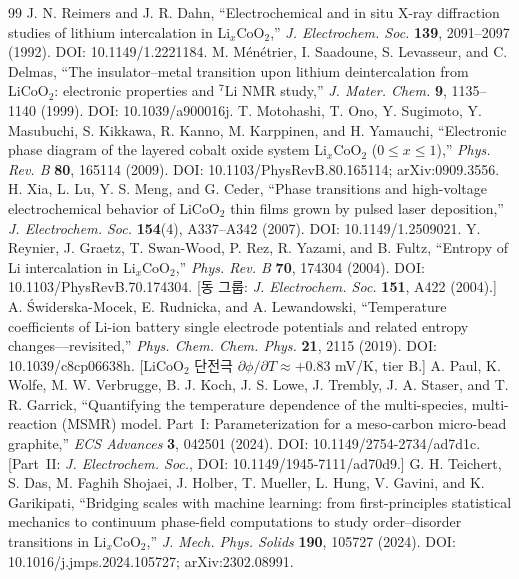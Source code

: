\documentclass[11pt,a4paper]{article}
\begin{document}
\begin{thebibliography}{99}
 J. N. Reimers and J. R. Dahn, ``Electrochemical and in situ X-ray diffraction studies of lithium intercalation in Li$_x$CoO$_2$,'' \emph{J. Electrochem. Soc.} \textbf{139}, 2091--2097 (1992). DOI: 10.1149/1.2221184.
 M. M\'en\'etrier, I. Saadoune, S. Levasseur, and C. Delmas, ``The insulator--metal transition upon lithium deintercalation from LiCoO$_2$: electronic properties and $^7$Li NMR study,'' \emph{J. Mater. Chem.} \textbf{9}, 1135--1140 (1999). DOI: 10.1039/a900016j.
 T. Motohashi, T. Ono, Y. Sugimoto, Y. Masubuchi, S. Kikkawa, R. Kanno, M. Karppinen, and H. Yamauchi, ``Electronic phase diagram of the layered cobalt oxide system Li$_x$CoO$_2$ ($0\le x\le1$),'' \emph{Phys. Rev. B} \textbf{80}, 165114 (2009). DOI: 10.1103/PhysRevB.80.165114; arXiv:0909.3556.
 H. Xia, L. Lu, Y. S. Meng, and G. Ceder, ``Phase transitions and high-voltage electrochemical behavior of LiCoO$_2$ thin films grown by pulsed laser deposition,'' \emph{J. Electrochem. Soc.} \textbf{154}(4), A337--A342 (2007). DOI: 10.1149/1.2509021.
 Y. Reynier, J. Graetz, T. Swan-Wood, P. Rez, R. Yazami, and B. Fultz, ``Entropy of Li intercalation in Li$_x$CoO$_2$,'' \emph{Phys. Rev. B} \textbf{70}, 174304 (2004). DOI: 10.1103/PhysRevB.70.174304. [동 그룹: \emph{J. Electrochem. Soc.} \textbf{151}, A422 (2004).]
 A. {\'S}widerska-Mocek, E. Rudnicka, and A. Lewandowski, ``Temperature coefficients of Li-ion battery single electrode potentials and related entropy changes---revisited,'' \emph{Phys. Chem. Chem. Phys.} \textbf{21}, 2115 (2019). DOI: 10.1039/c8cp06638h. [LiCoO$_2$ 단전극 $\partial\phi/\partial T\approx+0.83$ mV/K, tier B.]
 A. Paul, K. Wolfe, M. W. Verbrugge, B. J. Koch, J. S. Lowe, J. Trembly, J. A. Staser, and T. R. Garrick, ``Quantifying the temperature dependence of the multi-species, multi-reaction (MSMR) model. Part~I: Parameterization for a meso-carbon micro-bead graphite,'' \emph{ECS Advances} \textbf{3}, 042501 (2024). DOI: 10.1149/2754-2734/ad7d1c. [Part~II: \emph{J. Electrochem. Soc.}, DOI: 10.1149/1945-7111/ad70d9.]
 G. H. Teichert, S. Das, M. Faghih Shojaei, J. Holber, T. Mueller, L. Hung, V. Gavini, and K. Garikipati, ``Bridging scales with machine learning: from first-principles statistical mechanics to continuum phase-field computations to study order--disorder transitions in Li$_x$CoO$_2$,'' \emph{J. Mech. Phys. Solids} \textbf{190}, 105727 (2024). DOI: 10.1016/j.jmps.2024.105727; arXiv:2302.08991.
\end{thebibliography}
\end{document}
